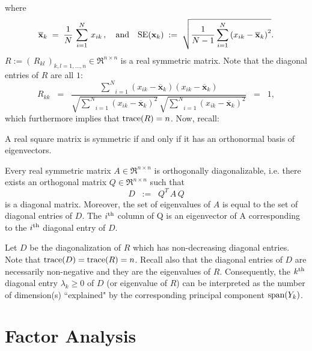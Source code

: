 \documentclass{article}
\begin{document}
where
\begin{equation*}
\overline{\mathbf{x}}_{k} \; = \; \dfrac{1}{N}\,\sum^{N}_{i=1}\,x_{ik}\,,
\quad\textnormal{and}\quad
\textnormal{SE}(\mathbf{x}_{k})
\; := \;
\sqrt{\dfrac{1}{N-1}\sum^{N}_{i=1}\left(x_{ik} - \overline{\mathbf{x}}_{k}\right)^{2}}.
\end{equation*}
$R := (\,R_{kl}\,)_{k,l=1,\ldots,n} \in \Re^{n \times n}$ is a real symmetric matrix.
Note that the diagonal entries of $R$ are all $1$:
\begin{equation*}
R_{kk}
\;\; = \;\;
\dfrac{\underset{i=1}{\overset{N}{\sum}}(x_{ik}-\overline{\mathbf{x}}_{k})(x_{ik}-\overline{\mathbf{x}}_{k})}
{\sqrt{\underset{i=1}{\overset{N}{\sum}}\left(x_{ik} - \overline{\mathbf{x}}_{k}\right)^{2}}\,\sqrt{\underset{i=1}{\overset{N}{\sum}}\left(x_{ik} - \overline{\mathbf{x}}_{k}\right)^{2}}}
\;\; = \;\;
1,
\end{equation*}
which furthermore implies that $\textnormal{trace}(R) = n$.
Now, recall:
\begin{theorem}\quad
A real square matrix is symmetric if and only if it has an orthonormal basis of eigenvectors.
\end{theorem}
\begin{theorem}\quad
Every real symmetric matrix $A \in \Re^{n \times n} $ is orthogonally diagonalizable, i.e.
there exists an orthogonal matrix $Q \in \Re^{n \times n}$ such that 
\begin{equation*}
  D \;\; := \;\;  Q^{T} \, A \, Q 
\end{equation*}
is a diagonal matrix.  Moreover, the set of eigenvalues of $A$ is equal to the set of diagonal entries of $D$.
The $i^{\textnormal{th}}$ column of Q is an eigenvector of A corresponding to the $i^{\textnormal{th}}$ diagonal
entry of $D$.
\end{theorem}
Let $D$ be the diagonalization of $R$ which has non-decreasing diagonal entries.
Note that $\textnormal{trace}(D) = \textnormal{trace}(R) = n$.  Recall also that the diagonal entries of $D$ are necessarily non-negative and they are the eigenvalues of $R$.  Consequently, the $k^{\textnormal{th}}$ diagonal entry $\lambda_{k}\geq 0$ of $D$ (or eigenvalue of $R$) can be interpreted as the number of dimension(s) ``explained" by the corresponding principal component $\textnormal{span}\!\left(Y_{k}\right)$.


\section{Factor Analysis}
\setcounter{theorem}{0}
\end{document}
